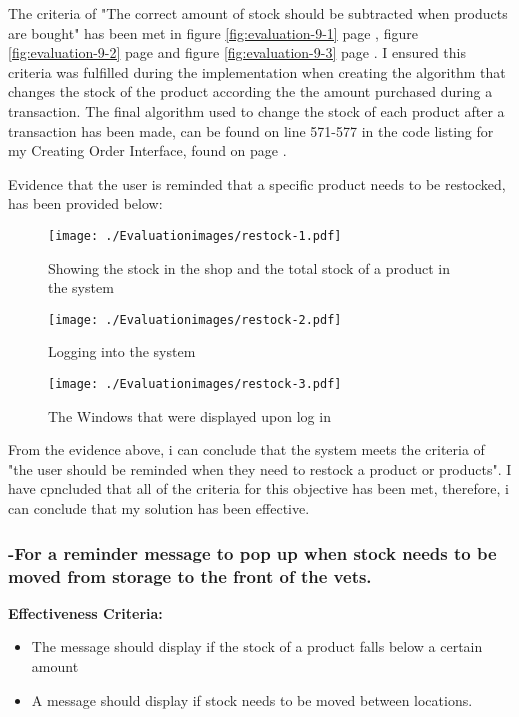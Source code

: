 The criteria of "The correct amount of stock should be subtracted when products are bought" has been met in figure \ref{fig:evaluation-9-1} page \pageref{fig:evaluation-9-1}, figure \ref{fig:evaluation-9-2} page \pageref{fig:evaluation-9-2} and figure \ref{fig:evaluation-9-3} page \pageref{fig:evaluation-9-3}.  I ensured this criteria was fulfilled during the implementation when creating the algorithm that changes the stock of the product according the the amount purchased during a transaction. The final algorithm used to change the stock of each product after a transaction has been made, can be found on line 571-577 in the code listing for my Creating Order Interface, found on page \pageref{order}.

Evidence that the user is reminded that a specific product needs to be restocked, has been provided below:

\begin{figure}[H]
\caption{Showing the stock in the shop and the total stock of a product in the system}
\hfill\texttt{[image: ./Evaluationimages/restock-1.pdf]}
\end{figure}

\begin{figure}[H]
\caption{Logging into the system}
\hfill\texttt{[image: ./Evaluationimages/restock-2.pdf]}
\end{figure}

\begin{figure}[H]
\caption{The Windows that were displayed upon log in}
\hfill\texttt{[image: ./Evaluationimages/restock-3.pdf]}
\end{figure}

From the evidence above, i can conclude that the system meets the criteria of "the user should be reminded when they need to restock a product or products". I have cpncluded that all of the criteria for this objective has been met, therefore, i can conclude that my solution has been effective.








\pagebreak
\subsubsection{-For a reminder message to pop up when stock needs to be moved from storage to the front of the vets. }

\textbf{Effectiveness Criteria:}\newline
\begin{itemize}
	\item{The message should display if the stock of a product falls below a certain amount}
	\item{A message should display if stock needs to be moved between locations.}
\end{itemize}

